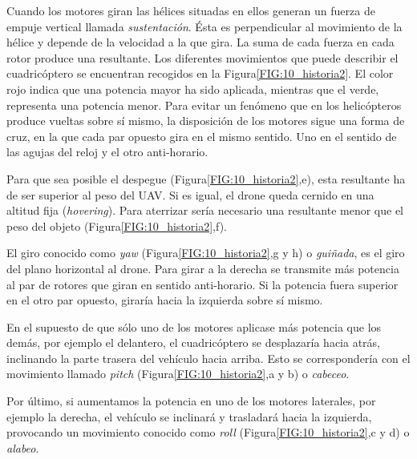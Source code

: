 Cuando los motores giran las hélices situadas en ellos generan un fuerza de empuje vertical llamada \textit{sustentación}. Ésta es perpendicular al movimiento de la hélice y depende de la velocidad a la que gira. La suma de cada fuerza en cada rotor produce una resultante. Los diferentes movimientos que puede describir el cuadricóptero se encuentran recogidos en la Figura\ref{FIG:10_historia2}. El color rojo indica que una potencia mayor ha sido aplicada, mientras que el verde, representa una potencia menor. Para evitar un fenómeno que en los helicópteros produce vueltas sobre sí mismo, la disposición de los motores sigue una forma de cruz, en la que cada par opuesto gira en el mismo sentido. Uno en el sentido de las agujas del reloj y el otro anti-horario.

Para que sea posible el despegue (Figura\ref{FIG:10_historia2},e), esta resultante ha de ser superior al peso del UAV. Si es igual, el drone queda cernido en una altitud fija (\textit{hovering}). Para aterrizar sería necesario una resultante menor que el peso del objeto (Figura\ref{FIG:10_historia2},f).

El giro conocido como \textit{yaw} (Figura\ref{FIG:10_historia2},g y h) o \textit{guiñada}, es el giro del plano horizontal al drone. Para girar a la derecha se transmite más potencia al par de rotores que giran en sentido anti-horario. Si la potencia fuera superior en el otro par opuesto, giraría hacia la izquierda sobre sí mismo.

En el supuesto de que sólo uno de los motores aplicase más potencia que los demás, por ejemplo el delantero, el cuadricóptero se desplazaría hacia atrás, inclinando la parte trasera del vehículo hacia arriba. Esto se correspondería con el movimiento llamado \textit{pitch} (Figura\ref{FIG:10_historia2},a y b) o \textit{cabeceo}.

Por último, si aumentamos la potencia en uno de los motores laterales, por ejemplo la derecha, el vehículo se inclinará y trasladará hacia la izquierda, provocando un movimiento conocido como \textit{roll} (Figura\ref{FIG:10_historia2},c y d) o \textit{alabeo}. 

